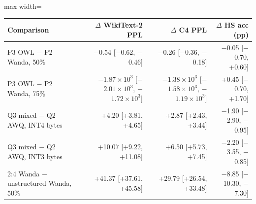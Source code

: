 \scriptsize
\setlength{\tabcolsep}{3.5pt}
\label{tab:t1boot}
\begin{adjustbox}{max width=\linewidth}
\begin{tabular}{lrrr}
\toprule
Comparison & $\Delta$ WikiText-2 PPL & $\Delta$ C4 PPL & $\Delta$ HS acc (pp) \\
\midrule
P3 OWL $-$ P2 Wanda, 50\% & $-$0.54 [$-$0.62, $-$0.46] & $-$0.26 [$-$0.36, $-$0.18] & $-$0.05 [$-$0.70, +0.60] \\
P3 OWL $-$ P2 Wanda, 75\% & $-$$1.87\times10^{3}$ [$-$$2.01\times10^{3}$, $-$$1.72\times10^{3}$] & $-$$1.38\times10^{3}$ [$-$$1.58\times10^{3}$, $-$$1.19\times10^{3}$] & +0.45 [$-$0.70, +1.70] \\
Q3 mixed $-$ Q2 AWQ, INT4 bytes & +4.20 [+3.81, +4.65] & +2.87 [+2.43, +3.44] & $-$1.90 [$-$2.90, $-$0.95] \\
Q3 mixed $-$ Q2 AWQ, INT3 bytes & +10.07 [+9.22, +11.08] & +6.50 [+5.73, +7.45] & $-$2.20 [$-$3.55, $-$0.85] \\
2:4 Wanda $-$ unstructured Wanda, 50\% & +41.37 [+37.61, +45.58] & +29.79 [+26.54, +33.48] & $-$8.85 [$-$10.30, $-$7.30] \\
\bottomrule
\end{tabular}
\end{adjustbox}
